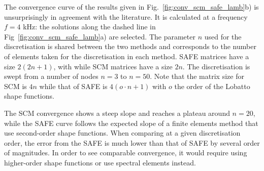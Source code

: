 The convergence curve of the results given in Fig.~\ref{fig:conv_scm_safe_lamb}b) is unsurprisingly in agreement with the literature. It is calculated at a frequency $f=4$ kHz: the solutions along the dashed line in Fig~\ref{fig:conv_scm_safe_lamb}a) are selected. The parameter $n$ used for the discretisation is shared between the two methods and corresponds to the number of elements taken for the discretisation in each method. SAFE matrices have a size $2(2n+ 1)$, with while SCM matrices have a size $2n$. The discretisation is swept from a number of nodes $n=3$ to $n=50$. Note that the matrix size for SCM is $4n$ while that of SAFE is $4(o \cdot n + 1)$ with $o$ the order of the Lobatto shape functions.

The SCM convergence shows a steep slope and reaches a plateau around $n = 20$, while the SAFE curve follows the expected slope of a finite elements method that use second-order shape functions. When comparing at a given discretisation order, the error from the SAFE is much lower than that of SAFE by several order of magnitudes. In order to see comparable convergence, it would require using higher-order shape functions or use spectral elements instead.